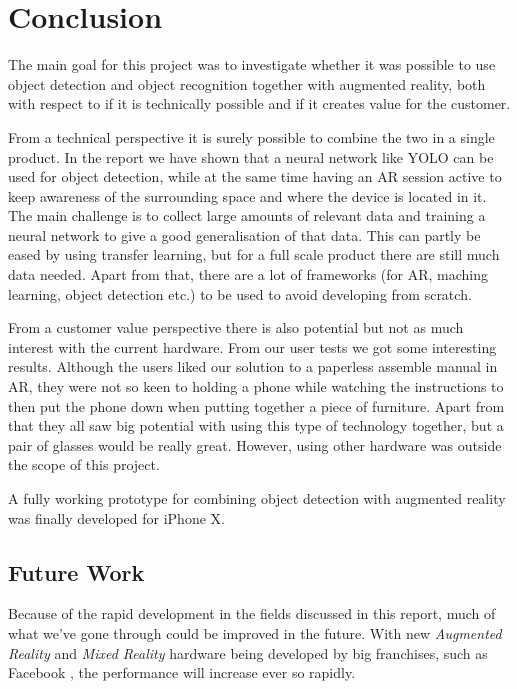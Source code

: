 \chapter{Conclusion}
The main goal for this project was to investigate whether it was possible to
use object detection and object recognition together with augmented reality, both with respect to
if it is technically possible and if it creates value for the customer.

From a technical perspective it is surely possible to combine the two in a single
product. In the report we have shown that a neural network like
YOLO can be used for object detection, while at the same time having an AR 
session active to keep awareness of the surrounding space and where the device 
is located in it. The main challenge is to collect large amounts of relevant data and
training a neural network to give a good generalisation of that data. This can 
partly be eased by using transfer learning, but for a full scale product there are
still much data needed.
Apart from that, there are a lot of frameworks (for AR, maching learning, 
object detection etc.) to be used to avoid developing from scratch.

From a customer value perspective there is also potential but not as much
interest with the current hardware. From our user tests we got some interesting
results. Although the users liked our solution to a paperless assemble manual in
AR, they were not so keen to holding a phone while watching the instructions to
then put the phone down when putting together a piece of furniture.
Apart from that they all saw big potential with using this type of technology
together, but a pair of glasses would be really great. However, using other 
hardware was outside the scope of this project.

A fully working prototype for combining object detection with augmented reality
was finally developed for iPhone X.

\section{Future Work}

Because of the rapid development in the fields discussed in this report, much of what we've gone through could be improved in the future. With new \textit{Augmented Reality} and \textit{Mixed Reality} hardware being developed by big franchises, such as Facebook \cite{facebookAR}, the performance will increase ever so rapidly.

